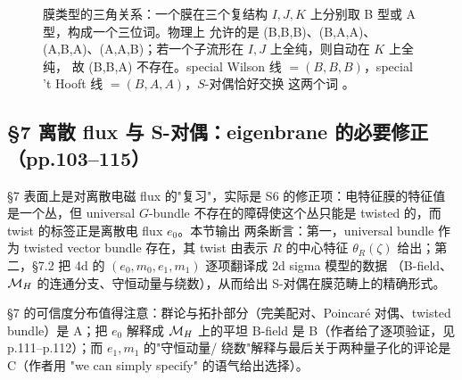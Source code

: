 \begin{figure}[htbp]
\centering
{}
\caption{膜类型的三角关系：一个膜在三个复结构 $I,J,K$ 上分别取 B 型或 A 型，构成一个三位词。物理上
允许的是 (B,B,B)、(B,A,A)、(A,B,A)、(A,A,B)；若一个子流形在 $I,J$ 上全纯，则自动在 $K$ 上全纯，
故 (B,B,A) 不存在。special Wilson 线 $=(B,B,B)$，special 't Hooft 线 $=(B,A,A)$，$S$-对偶恰好交换
这两个词 \pA{}。}
\label{fig:geom-brane-types}
\end{figure}

\subsection{\S7 离散 flux 与 S-对偶：eigenbrane 的必要修正（pp.103--115）}

\S7 表面上是对离散电磁 flux 的"复习"，实际是 S6 的修正项：电特征膜的特征值是一个丛，但 universal
$G$-bundle 不存在的障碍使这个丛只能是 twisted 的，而 twist 的标签正是离散电 flux $e_0$。本节输出
两条断言：第一，universal bundle 作为 twisted vector bundle 存在，其 twist 由表示 $R$ 的中心特征
$\theta_R(\zeta)$ 给出；第二，\S7.2 把 4d 的 $(e_0,m_0,e_1,m_1)$ 逐项翻译成 2d sigma 模型的数据
（B-field、$\mathcal{M}_H$ 的连通分支、守恒动量与绕数），从而给出 S-对偶在膜范畴上的精确形式。

\S7 的可信度分布值得注意：群论与拓扑部分（完美配对、Poincaré 对偶、twisted bundle）是 A；把 $e_0$
解释成 $\mathcal{M}_H$ 上的平坦 B-field 是 B（作者给了逐项验证，见 p.111--p.112）；而 $e_1,m_1$ 的"守恒动量/
绕数"解释与最后关于两种量子化的评论是 C（作者用 "we can simply specify" 的语气给出选择）。

